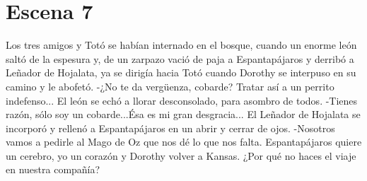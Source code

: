\chapter{Escena 7}
Los tres amigos y Totó se habían internado en el  bosque, cuando un enorme león saltó de la espesura y, de un zarpazo vació de paja a Espantapájaros y derribó a Leñador de Hojalata, ya se dirigía hacia Totó cuando Dorothy se interpuso en su camino y le abofetó.
-¿No te da vergüenza, cobarde? Tratar así a un perrito indefenso...
El león se echó a llorar desconsolado, para asombro de todos.
-Tienes razón, sólo soy un cobarde...Ésa es mi gran desgracia...
El Leñador de Hojalata se incorporó y rellenó a Espantapájaros en un abrir y cerrar de ojos.
-Nosotros vamos a pedirle al Mago de Oz que nos dé lo que nos falta. Espantapájaros quiere un cerebro, yo un corazón y Dorothy volver a Kansas. ¿Por qué no haces el viaje en nuestra compañía?
